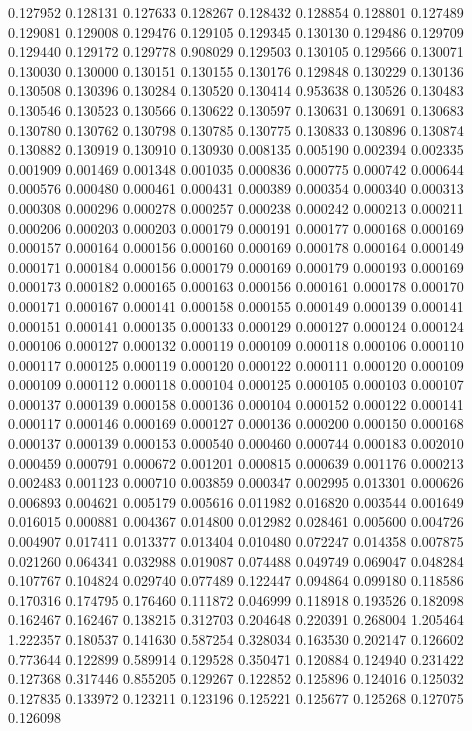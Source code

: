 0.127952
0.128131
0.127633
0.128267
0.128432
0.128854
0.128801
0.127489
0.129081
0.129008
0.129476
0.129105
0.129345
0.130130
0.129486
0.129709
0.129440
0.129172
0.129778
0.908029
0.129503
0.130105
0.129566
0.130071
0.130030
0.130000
0.130151
0.130155
0.130176
0.129848
0.130229
0.130136
0.130508
0.130396
0.130284
0.130520
0.130414
0.953638
0.130526
0.130483
0.130546
0.130523
0.130566
0.130622
0.130597
0.130631
0.130691
0.130683
0.130780
0.130762
0.130798
0.130785
0.130775
0.130833
0.130896
0.130874
0.130882
0.130919
0.130910
0.130930
0.008135
0.005190
0.002394
0.002335
0.001909
0.001469
0.001348
0.001035
0.000836
0.000775
0.000742
0.000644
0.000576
0.000480
0.000461
0.000431
0.000389
0.000354
0.000340
0.000313
0.000308
0.000296
0.000278
0.000257
0.000238
0.000242
0.000213
0.000211
0.000206
0.000203
0.000203
0.000179
0.000191
0.000177
0.000168
0.000169
0.000157
0.000164
0.000156
0.000160
0.000169
0.000178
0.000164
0.000149
0.000171
0.000184
0.000156
0.000179
0.000169
0.000179
0.000193
0.000169
0.000173
0.000182
0.000165
0.000163
0.000156
0.000161
0.000178
0.000170
0.000171
0.000167
0.000141
0.000158
0.000155
0.000149
0.000139
0.000141
0.000151
0.000141
0.000135
0.000133
0.000129
0.000127
0.000124
0.000124
0.000106
0.000127
0.000132
0.000119
0.000109
0.000118
0.000106
0.000110
0.000117
0.000125
0.000119
0.000120
0.000122
0.000111
0.000120
0.000109
0.000109
0.000112
0.000118
0.000104
0.000125
0.000105
0.000103
0.000107
0.000137
0.000139
0.000158
0.000136
0.000104
0.000152
0.000122
0.000141
0.000117
0.000146
0.000169
0.000127
0.000136
0.000200
0.000150
0.000168
0.000137
0.000139
0.000153
0.000540
0.000460
0.000744
0.000183
0.002010
0.000459
0.000791
0.000672
0.001201
0.000815
0.000639
0.001176
0.000213
0.002483
0.001123
0.000710
0.003859
0.000347
0.002995
0.013301
0.000626
0.006893
0.004621
0.005179
0.005616
0.011982
0.016820
0.003544
0.001649
0.016015
0.000881
0.004367
0.014800
0.012982
0.028461
0.005600
0.004726
0.004907
0.017411
0.013377
0.013404
0.010480
0.072247
0.014358
0.007875
0.021260
0.064341
0.032988
0.019087
0.074488
0.049749
0.069047
0.048284
0.107767
0.104824
0.029740
0.077489
0.122447
0.094864
0.099180
0.118586
0.170316
0.174795
0.176460
0.111872
0.046999
0.118918
0.193526
0.182098
0.162467
0.162467
0.138215
0.312703
0.204648
0.220391
0.268004
1.205464
1.222357
0.180537
0.141630
0.587254
0.328034
0.163530
0.202147
0.126602
0.773644
0.122899
0.589914
0.129528
0.350471
0.120884
0.124940
0.231422
0.127368
0.317446
0.855205
0.129267
0.122852
0.125896
0.124016
0.125032
0.127835
0.133972
0.123211
0.123196
0.125221
0.125677
0.125268
0.127075
0.126098
